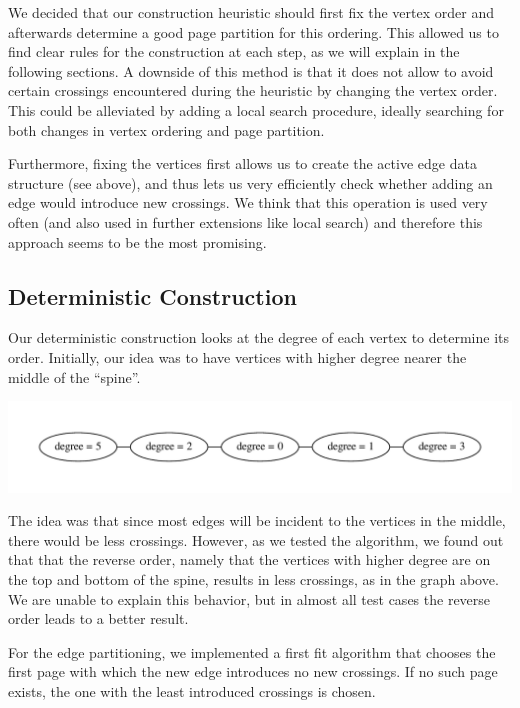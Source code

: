 \documentclass [11pt]{article}
\begin{document}
We decided that our construction heuristic should first fix the vertex order and afterwards determine a good page partition for this ordering. This allowed us to find clear rules for the construction at each step, as we will explain in the following sections. A downside of this method is that it does not allow to avoid certain crossings encountered during the heuristic by changing the vertex order. This could be alleviated by adding a local search procedure, ideally searching for both changes in vertex ordering and page partition. 

Furthermore, fixing the vertices first allows us to create the active edge data structure (see above), and thus lets us very efficiently check whether adding an edge would introduce new crossings. We think that this operation is used very often (and also used in further extensions like local search) and therefore this approach seems to be the most promising.


\subsection{Deterministic Construction}

Our deterministic construction looks at the degree of each vertex to determine its order. Initially, our idea was to have vertices with higher degree nearer the middle of the ``spine''.

\begin{center}
    \includegraphics[scale=0.6]{bilder/graph.pdf}
\end{center}

The idea was that since most edges will be incident to the vertices in the middle, there would be less crossings. However, as we tested the algorithm, we found out that that the reverse order, namely that the vertices with higher degree are on the top and bottom of the spine, results in less crossings, as in the graph above.  We are unable to explain this behavior, but in almost all test cases the reverse order leads to a better result. 


For the edge partitioning, we implemented a first fit algorithm that chooses the first page with which the new edge introduces no new crossings. If no such page exists, the one with the least introduced crossings is chosen. 
\end{document}
